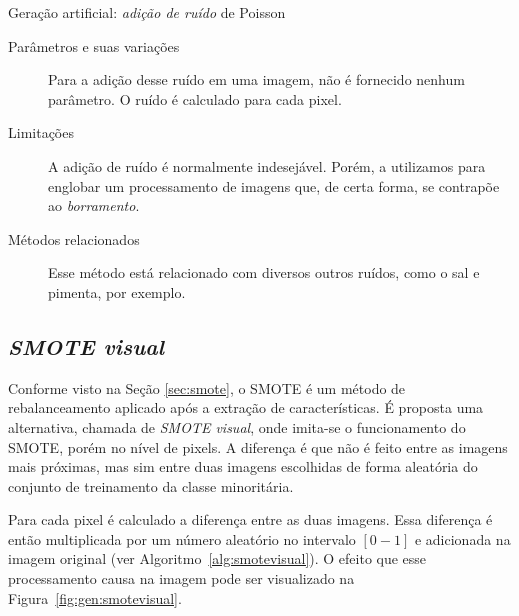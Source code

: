 \begin{algorithm}[!htbp]
  \caption{Geração artificial: \emph{adição de ruído} de Poisson}
  \label{alg:noise}
  \SetAlgoLined

\end{algorithm}

\begin{description}
  \item[Parâmetros e suas variações] Para a adição desse ruído em uma imagem, não é fornecido nenhum parâmetro. O ruído é calculado para cada pixel.
  \item[Limitações] A adição de ruído é normalmente indesejável. Porém, a utilizamos para englobar um processamento de imagens que, de certa forma, se contrapõe ao \emph{borramento}.
  \item[Métodos relacionados] Esse método está relacionado com diversos outros ruídos, como o sal e pimenta, por exemplo.
\end{description}
\FloatBarrier
\subsection{\emph{SMOTE visual}}

Conforme visto na Seção \ref{sec:smote}, o SMOTE é um método de rebalanceamento aplicado após a extração de características. É proposta uma alternativa, chamada de \emph{SMOTE visual}, onde imita-se o funcionamento do SMOTE, porém no nível de pixels. A diferença é que não é feito entre as imagens mais próximas, mas sim entre duas imagens escolhidas de forma aleatória do conjunto de treinamento da classe minoritária.

Para cada pixel é calculado a diferença entre as duas imagens. Essa diferença é então multiplicada por um número aleatório no intervalo $[0-1]$ e adicionada
na imagem original (ver Algoritmo~\ref{alg:smotevisual}). O efeito que esse processamento causa na imagem pode ser visualizado na Figura~\ref{fig:gen:smotevisual}.

